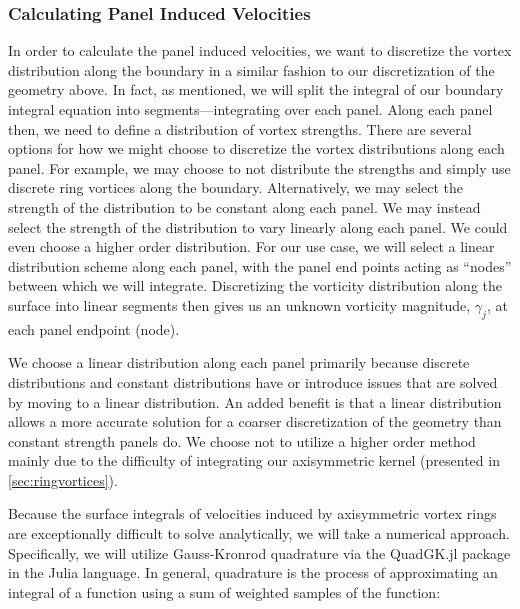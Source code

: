 \subsubsection{Calculating Panel Induced Velocities}


In order to calculate the panel induced velocities, we want to discretize the vortex distribution along the boundary in a similar fashion to our discretization of the geometry above.
%
In fact, as mentioned, we will split the integral of our boundary integral equation into segments---integrating over each panel.
%
Along each panel then, we need to define a distribution of vortex strengths.
%
There are several options for how we might choose to discretize the vortex distributions along each panel.
%
For example, we may choose to not distribute the strengths and simply use discrete ring vortices along the boundary.
%
Alternatively, we may select the strength of the distribution to be constant along each panel.
%
We may instead select the strength of the distribution to vary linearly along each panel.
%
We could even choose a higher order distribution.
%
For our use case, we will select a linear distribution scheme along each panel, with the panel end points acting as ``nodes'' between which we will integrate.
%
Discretizing the vorticity distribution along the surface into linear segments then gives us an unknown vorticity magnitude, \(\gamma_j\), at each panel endpoint (node).

We choose a linear distribution along each panel primarily because discrete distributions and constant distributions have or introduce issues that are solved by moving to a linear distribution.
%
An added benefit is that a linear distribution allows a more accurate solution for a coarser discretization of the geometry than constant strength panels do.
%
We choose not to utilize a higher order method mainly due to the difficulty of integrating our axisymmetric kernel (presented in \cref{sec:ringvortices}).

Because the surface integrals of velocities induced by axisymmetric vortex rings are exceptionally difficult to solve analytically, we will take a numerical approach.
%
Specifically, we will utilize Gauss-Kronrod quadrature via the QuadGK.jl
package in the Julia language.
%
In general, quadrature is the process of approximating an integral of a function using a sum of weighted samples of the function:

